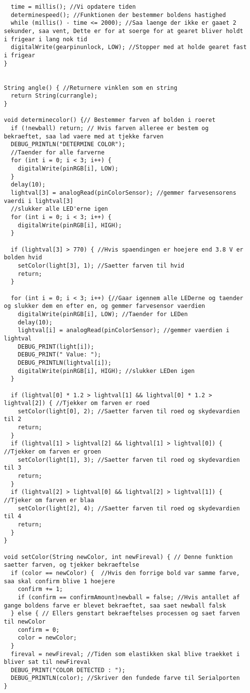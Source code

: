 \begin{lstlisting}
  time = millis(); //Vi opdatere tiden
  determinespeed(); //Funktionen der bestemmer boldens hastighed
  while (millis() - time <= 2000); //Saa laenge der ikke er gaaet 2 sekunder, saa vent, Dette er for at soerge for at gearet bliver holdt i frigear i lang nok tid
  digitalWrite(gearpinunlock, LOW); //Stopper med at holde gearet fast i frigear
}


String angle() { //Returnere vinklen som en string
  return String(currangle);
}

void determinecolor() {// Bestemmer farven af bolden i roeret
  if (!newball) return; // Hvis farven alleree er bestem og bekraeftet, saa lad vaere med at tjekke farven
  DEBUG_PRINTLN("DETERMINE COLOR");
  //Taender for alle farverne
  for (int i = 0; i < 3; i++) {
    digitalWrite(pinRGB[i], LOW);
  }
  delay(10);
  lightval[3] = analogRead(pinColorSensor); //gemmer farvesensorens vaerdi i lightval[3]
  //slukker alle LED'erne igen
  for (int i = 0; i < 3; i++) {
    digitalWrite(pinRGB[i], HIGH);
  }

  if (lightval[3] > 770) { //Hvis spaendingen er hoejere end 3.8 V er bolden hvid
    setColor(light[3], 1); //Saetter farven til hvid
    return;
  }

  for (int i = 0; i < 3; i++) {//Gaar igennem alle LEDerne og taender og slukker dem en efter en, og gemmer farvesensor vaerdien
    digitalWrite(pinRGB[i], LOW); //Taender for LEDen
    delay(10);
    lightval[i] = analogRead(pinColorSensor); //gemmer vaerdien i lightval
    DEBUG_PRINT(light[i]);
    DEBUG_PRINT(" Value: ");
    DEBUG_PRINTLN(lightval[i]);
    digitalWrite(pinRGB[i], HIGH); //slukker LEDen igen
  }

  if (lightval[0] * 1.2 > lightval[1] && lightval[0] * 1.2 > lightval[2]) { //Tjekker om farven er roed
    setColor(light[0], 2); //Saetter farven til roed og skydevardien til 2
    return;
  }
  if (lightval[1] > lightval[2] && lightval[1] > lightval[0]) { //Tjekker om farven er groen
    setColor(light[1], 3); //Saetter farven til roed og skydevardien til 3
    return;
  }
  if (lightval[2] > lightval[0] && lightval[2] > lightval[1]) { //Tjeker om farven er blaa
    setColor(light[2], 4); //Saetter farven til roed og skydevardien til 4
    return;
  }
}

void setColor(String newColor, int newFireval) { // Denne funktion saetter farven, og tjekker bekraeftelse
  if (color == newColor) {  //Hvis den forrige bold var samme farve, saa skal confirm blive 1 hoejere
    confirm += 1;
    if (confirm == confirmAmount)newball = false; //Hvis antallet af gange boldens farve er blevet bekraeftet, saa saet newball falsk
  } else { // Ellers genstart bekraeftelses processen og saet farven til newColor
    confirm = 0;
    color = newColor;
  }
  fireval = newFireval; //Tiden som elastikken skal blive traekket i bliver sat til newFireval
  DEBUG_PRINT("COLOR DETECTED : ");
  DEBUG_PRINTLN(color); //Skriver den fundede farve til Serialporten
}


\end{lstlisting}
